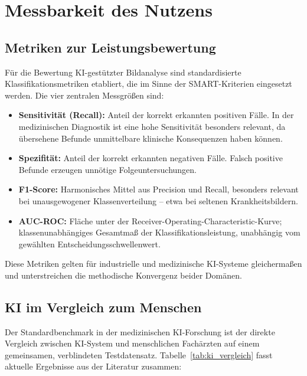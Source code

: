 \section{Messbarkeit des Nutzens} \label{sec:messbarkeit}

\subsection{Metriken zur Leistungsbewertung} \label{sec:metriken}

Für die Bewertung KI-gestützter Bildanalyse sind standardisierte Klassifikationsmetriken
etabliert, die im Sinne der SMART-Kriterien eingesetzt werden. Die vier zentralen
Messgrößen sind:

\begin{itemize}
    \item \textbf{Sensitivität (Recall):} Anteil der korrekt erkannten positiven Fälle.
          In der medizinischen Diagnostik ist eine hohe Sensitivität besonders relevant,
          da übersehene Befunde unmittelbare klinische Konsequenzen haben können.
    \item \textbf{Spezifität:} Anteil der korrekt erkannten negativen Fälle. Falsch
          positive Befunde erzeugen unnötige Folgeuntersuchungen.
    \item \textbf{F1-Score:} Harmonisches Mittel aus Precision und Recall, besonders
          relevant bei unausgewogener Klassenverteilung -- etwa bei seltenen
          Krankheitsbildern.
    \item \textbf{AUC-ROC:} Fläche unter der Receiver-Operating-Characteristic-Kurve;
          klassenunabhängiges Gesamtmaß der Klassifikationsleistung, unabhängig vom
          gewählten Entscheidungsschwellenwert.
\end{itemize}

Diese Metriken gelten für industrielle und medizinische KI-Systeme gleichermaßen und
unterstreichen die methodische Konvergenz beider Domänen.

\subsection{KI im Vergleich zum Menschen} \label{sec:ki_vs_mensch}

Der Standardbenchmark in der medizinischen KI-Forschung ist der direkte Vergleich
zwischen KI-System und menschlichen Fachärzten auf einem gemeinsamen, verblindeten
Testdatensatz. Tabelle~\ref{tab:ki_vergleich} fasst aktuelle Ergebnisse aus der Literatur
zusammen:

